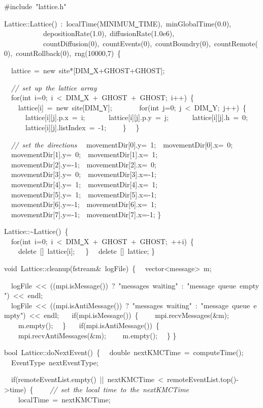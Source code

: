 {\ttfamily \raggedright \footnotesize
\#include\ "{}lattice.h"{}

Lattice::Lattice()\ :\ localTime(MINIMUM\underline\ TIME),\ minGlobalTime(0.0),
\ \ \ \ \ \ \ \ \ \ \ depositionRate(1.0),\ diffusionRate(1.0e6),
\ \ \ \ \ \ \ \ \ \ \ countDiffusion(0),\ countEvents(0),\ countBoundry(0),\ countRemote(0),\ countRollback(0),\ rng(10000,7)\ \{

\ \ lattice\ =\ new\ site*[DIM\underline\ X+GHOST+GHOST];

\ \ \textsl{//\ set\ up\ the\ lattice\ array}
\ \ for(int\ i=0;\ i\ <{}\ DIM\underline\ X\ +\ GHOST\ +\ GHOST;\ i++)\ \{
\ \ \ \ lattice[i]\ =\ new\ site[DIM\underline\ Y];
\ \ \
\ \ \ \ for(int\ j=0;\ j\ <{}\ DIM\underline\ Y;\ j++)\ \{
\ \ \ \ \ \ lattice[i][j].p.x\ =\ i;
\ \ \ \ \ \ lattice[i][j].p.y\ =\ j;
\ \ \ \ \ \ lattice[i][j].h\ =\ 0;
\ \ \ \ \ \ lattice[i][j].listIndex\ =\ -{}1;
\ \ \ \ \}
\ \ \}

\ \ \textsl{//\ set\ the\ directions}
\ \ movementDir[0].y=\ 1;\ \ movementDir[0].x=\ 0;
\ \ movementDir[1].y=\ 0;\ \ movementDir[1].x=\ 1;
\ \ movementDir[2].y=-{}1;\ \ movementDir[2].x=\ 0;
\ \ movementDir[3].y=\ 0;\ \ movementDir[3].x=-{}1;
\ \ movementDir[4].y=\ 1;\ \ movementDir[4].x=\ 1;
\ \ movementDir[5].y=\ 1;\ \ movementDir[5].x=-{}1;
\ \ movementDir[6].y=-{}1;\ \ movementDir[6].x=\ 1;
\ \ movementDir[7].y=-{}1;\ \ movementDir[7].x=-{}1;
\}

Lattice::\textasciitilde Lattice()\ \{
\ \ for(int\ i=0;\ i\ <{}\ DIM\underline\ X\ +\ GHOST\ +\ GHOST;\ ++i)\ \{
\ \ \ \ delete\ []\ lattice[i];\
\ \ \}
\ \ delete\ []\ lattice;
\}

void\ Lattice::cleanup(fstream\&\ logFile)\ \{
\ \ vector<{}message>{}\ m;

\ \ logFile\ <{}<{}\ ((mpi.isMessage())\ ?\ "{}messages\ waiting"{}\ :\ "{}message\ queue\ empty"{})\ <{}<{}\ endl;
\ \ logFile\ <{}<{}\ ((mpi.isAntiMessage())\ ?\ "{}messages\ waiting"{}\ :\ "{}message\ queue\ empty"{})\ <{}<{}\ endl;
\
\ \ if(mpi.isMessage())\ \{
\ \ \ \ mpi.recvMessages(\&m);
\ \ \ \ m.empty();
\ \ \}
\
\ \ if(mpi.isAntiMessage())\ \{
\ \ \ \ mpi.recvAntiMessages(\&m);
\ \ \ \ m.empty();
\ \ \}
\}

bool\ Lattice::doNextEvent()\ \{
\ \ double\ nextKMCTime\ =\ computeTime();
\ \ EventType\ nextEventType;

\ \ if(remoteEventList.empty()\ ||\ nextKMCTime\ <{}\ remoteEventList.top()-{}>{}time)\ \{
\ \ \ \ \textsl{//\ set\ the\ local\ time\ to\ the\ nextKMCTime}
\ \ \ \ localTime\ =\ nextKMCTime;

}
